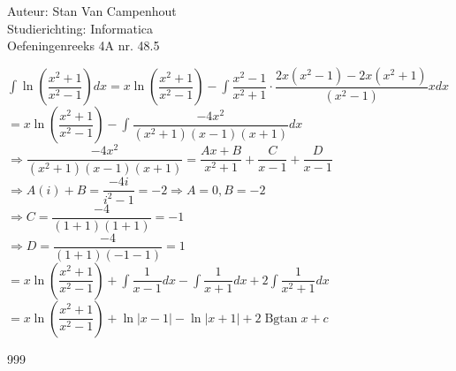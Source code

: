 \documentclass[a4paper]{article}
\begin{document}
  
\noindent \large Auteur: Stan Van Campenhout \\
\noindent \large Studierichting:  Informatica\\
\noindent \large Oefeningenreeks 4A nr. 48.5\\

\medskip

\normalsize

$ \displaystyle\int\ln\left(\dfrac{x^2+1}{x^2-1}\right)dx =x\ln\left(\dfrac{x^2+1}{x^2-1}\right) - \displaystyle\int\dfrac{x^2-1}{x^2+1}\cdot\dfrac{2x\left(x^2-1\right)-2x\left(x^2+1\right)}{\left(x^2-1\right)}xdx $\\

$ = x\ln\left(\dfrac{x^2+1}{x^2-1}\right) - \displaystyle\int\dfrac{-4x^2}{\left(x^2+1\right)\left(x-1\right)\left(x+1\right)}dx $\\

$ \Rightarrow \dfrac{-4x^2}{\left(x^2+1\right)\left(x-1\right)\left(x+1\right)} = \dfrac{Ax+B}{x^2+1} + \dfrac{C}{x-1} + \dfrac{D}{x-1} $\\

$ \Rightarrow A\left(i\right)+B = \dfrac{-4i}{i^2-1} = -2 \Rightarrow A = 0, B = -2 $\\

$ \Rightarrow C = \dfrac{-4}{\left(1+1\right)\left(1+1\right)} = -1 $\\

$ \Rightarrow D = \dfrac{-4}{\left(1+1\right)\left(-1-1\right)} = 1 $\\

$ = x\ln\left(\dfrac{x^2+1}{x^2-1}\right) + \displaystyle\int\dfrac{1}{x-1}dx-\displaystyle\int\dfrac{1}{x+1}dx+2\displaystyle\int\dfrac{1}{x^2+1}dx $\\

$ = x\ln\left(\dfrac{x^2+1}{x^2-1}\right) + \ln|x-1| - \ln|x+1| + 2\operatorname{Bgtan}x + c $\\

\begin{thebibliography}{999}
\end{thebibliography}
\end{document}
